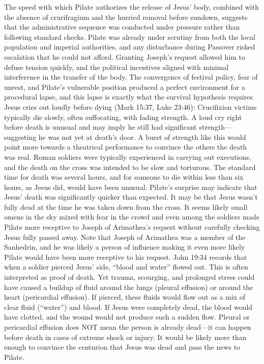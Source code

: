 The speed with which Pilate authorizes the release of Jesus' body, combined with the absence of crurifragium and the hurried removal before sundown, suggests that the administrative sequence was conducted under pressure rather than following standard checks.
Pilate was already under scrutiny from both the local population and imperial authorities, and any disturbance during Passover risked escalation that he could not afford.
Granting Joseph's request allowed him to defuse tension quickly, and the political incentives aligned with minimal interference in the transfer of the body.
The convergence of festival policy, fear of unrest, and Pilate's vulnerable position produced a perfect environment for a procedural lapse, and this lapse is exactly what the survival hypothesis requires.
Jesus cries out loudly before dying (Mark 15:37, Luke 23:46): Crucifixion victims typically die slowly, often suffocating, with fading strength.
A loud cry right before death is unusual and may imply he still had significant strength---suggesting he was not yet at death’s door.
A burst of strength like this would point more towards a theatrical performance to convince the others the death was real.
Roman soldiers were typically experienced in carrying out executions, and the death on the cross was intended to be slow and torturous.
The standard time for death was several hours, and for someone to die within less than six hours, as Jesus did, would have been unusual.
Pilate’s surprise may indicate that Jesus’ death was significantly quicker than expected.
It may be that Jesus wasn’t fully dead at the time he was taken down from the cross.
It seems likely small omens in the sky mixed with fear in the crowd and even among the soldiers made Pilate more receptive to Joseph of Arimathea’s request without carefully checking Jesus fully passed away.
Note that Joseph of Arimathea was a member of the Sanhedrin, and he was likely a person of influence making it even more likely Pilate would have been more receptive to his request.
John 19:34 records that when a soldier pierced Jesus' side, ``blood and water'' flowed out.
This is often interpreted as proof of death.
Yet trauma, scourging, and prolonged stress could have caused a buildup of fluid around the lungs (pleural effusion) or around the heart (pericardial effusion).
If pierced, these fluids would flow out as a mix of clear fluid (``water'') and blood.
If Jesus were completely dead, the blood would have clotted, and the wound would not produce such a sudden flow.
Pleural or pericardial effusion does NOT mean the person is already dead---it can happen before death in cases of extreme shock or injury.
It would be likely more than enough to convince the centurion that Jesus was dead and pass the news to Pilate.

